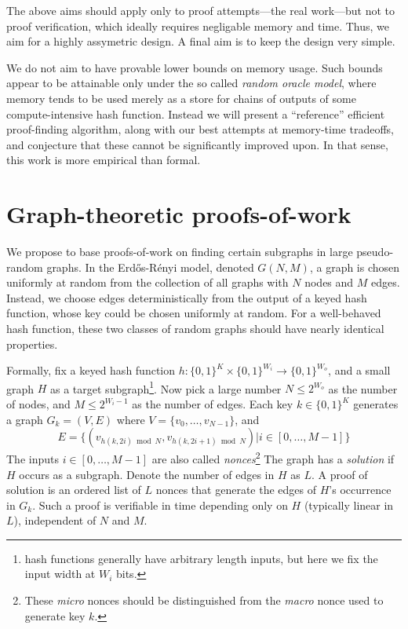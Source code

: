 \documentclass[11pt, oneside]{article}
\begin{document}
The above aims should apply only to proof attempts---the real work---but not to proof verification,
which ideally requires negligable memory and time. Thus, we aim for a highly assymetric design.
A final aim is to keep the design very simple.

We do not aim to have provable lower bounds on memory usage. Such bounds appear to be
attainable only under the so called {\em random oracle model}, where memory tends to be used
merely as a store for chains of outputs of some compute-intensive hash function.
Instead we will present a ``reference'' efficient proof-finding algorithm,
along with our best attempts at memory-time tradeoffs,
and conjecture that these cannot be significantly improved upon.
In that sense, this work is more empirical than formal.

\section{Graph-theoretic proofs-of-work}
We propose to base proofs-of-work on finding certain subgraphs in large pseudo-random graphs.
In the Erd\H{o}s-R\'{e}nyi model, denoted $G(N,M)$, a graph is chosen uniformly at random
from the collection of all graphs with $N$ nodes and $M$ edges. Instead, we choose edges
deterministically from the output of a keyed hash function, whose key could be chosen
uniformly at random. For a well-behaved hash function, these two classes of random graphs
should have nearly identical properties.

Formally, fix a keyed hash function
$h: \{0,1\}^K \times \{0,1\}^{W_i} \rightarrow \{0,1\}^{W_o}$,
and a small graph $H$ as a target subgraph\footnote{hash functions generally have arbitrary length inputs,
but here we fix the input width at $W_i$ bits.}.
Now pick a large number $N \leq 2^{W_o}$ as the number of nodes,
and $M \leq 2^{W_i-1}$ as the number of edges.
Each key $k \in \{0,1\}^K$ generates a graph $G_k = (V,E)$ where $V=\{v_0,\ldots,v_{N-1}\}$, and
\begin{equation}
E=\{(v_{h(k,2i) \bmod N},v_{h(k,2i+1) \bmod N}) | i \in [0,\ldots,M-1]\}
\end{equation}
The inputs $i \in [0,\ldots,M-1]$ are also called {\em nonces}\footnote{These
{\em micro} nonces should be distinguished from the {\em macro} nonce used to generate key $k$.}
The graph has a {\em solution} if $H$ occurs as a subgraph.
Denote the number of edges in $H$ as $L$.
A proof of solution is an ordered list of $L$ nonces that generate the edges
of $H$'s occurrence in $G_k$.
Such a proof is verifiable in time depending only on $H$ (typically linear in $L$), independent of $N$ and $M$.
\end{document}
